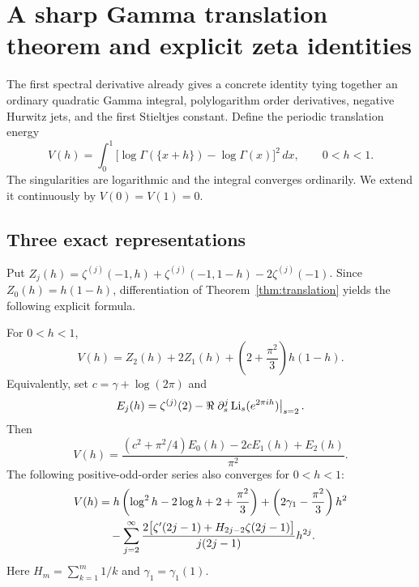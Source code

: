 \section{A sharp Gamma translation theorem and explicit zeta identities}
\label{sec:gamma}

The first spectral derivative already gives a concrete identity tying
together an ordinary quadratic Gamma integral, polylogarithm order
derivatives, negative Hurwitz jets, and the first Stieltjes constant.
Define the periodic translation energy
\begin{equation}\label{eq:V-def}
 V(h)=\int_0^1
   \bigl[\log\Gamma(\{x+h\})-\log\Gamma(x)\bigr]^2\,dx,
 \qquad 0<h<1.
\end{equation}
The singularities are logarithmic and the integral converges ordinarily.
We extend it continuously by $V(0)=V(1)=0$.

\subsection{Three exact representations}

Put $Z_j(h)=\zeta^{(j)}(-1,h)+\zeta^{(j)}(-1,1-h)
-2\zeta^{(j)}(-1)$. Since $Z_0(h)=h(1-h)$, differentiation of
Theorem~\ref{thm:translation} yields the following explicit formula.

\begin{theorem}\label{thm:gamma-id}
For $0<h<1$,
\begin{equation}\label{eq:gamma-hurwitz}
 \boxed{\quad V(h)=Z_2(h)+2Z_1(h)
                  +\left(2+\frac{\pi^2}{3}\right)h(1-h).\quad}
\end{equation}
Equivalently, set $c=\gamma+\log(2\pi)$ and
\[
 E_j(h)=\zeta^{(j)}(2)-
       \Re\left.\partial_s^j\operatorname{Li}_s(e^{2\pi ih})\right|_{s=2}.
\]
Then
\begin{equation}\label{eq:gamma-polylog}
 V(h)=\frac{(c^2+\pi^2/4)E_0(h)-2cE_1(h)+E_2(h)}{\pi^2}.
\end{equation}
The following positive-odd-order series also converges for $0<h<1$:
\begin{align}
 V(h)&=h\left(\log^2h-2\log h+2+\frac{\pi^2}{3}\right)
          +\left(2\gamma_1-\frac{\pi^2}{3}\right)h^2\notag\\
 &\quad-\sum_{j=2}^{\infty}
    \frac{2\bigl[\zeta'(2j-1)+H_{2j-2}\zeta(2j-1)\bigr]}
         {j(2j-1)}h^{2j}.
 \label{eq:gamma-series}
\end{align}
Here $H_m=\sum_{k=1}^m1/k$ and $\gamma_1=\gamma_1(1)$.
\end{theorem}

